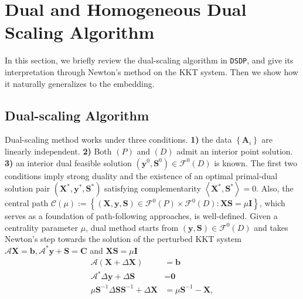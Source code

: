 \section{Dual and Homogeneous Dual Scaling Algorithm }\label{sec3}

In this section, we briefly review the dual-scaling algorithm in
{{\texttt{DSDP}}}, and give its interpretation through Newton's method on the KKT system. Then we show how it naturally generalizes to the embedding.
\subsection{Dual-scaling Algorithm}
Dual-scaling method
{\cite{benson1999mixed}} works under three conditions. {\textbf{1)}} the
 data $\left\{ \mathbf{A}_i \right\}$ are linearly independent.
{\textbf{2)}} Both $(P)$ and $(D)$ admit an interior point
solution. {\textbf{3)}} an interior dual feasible solution $\left( \mathbf{y}^0,
\mathbf{S}^0 \right) \in \mathcal{F}^0 (D)$ is known. The first two conditions imply
strong duality and the existence of an optimal primal-dual solution pair $\left(
\mathbf{X}^{\ast}, \mathbf{y}^{\ast}, \mathbf{S}^{\ast} \right)$ satisfying complementarity
$\left\langle \mathbf{X}^{\ast}, \mathbf{S}^{\ast} \right\rangle = 0$. Also, the central path $\mathcal{C} (\mu) :=
\left\{ \left( \mathbf{X}, \mathbf{y}, \mathbf{S} \right) \in \mathcal{F}^0 (P) \times \mathcal{F}^0
(D) : \mathbf{X} \mathbf{S} = \mu \mathbf{I} \right\}$, which serves as a foundation of
path-following approaches, is well-defined. Given a centrality parameter $\mu$, 
dual method starts from
$\left( \mathbf{y}, \mathbf{S} \right) \in \mathcal{F}^0(D)$ and takes Newton's step towards the solution of the perturbed KKT system $\mathcal{A} \mathbf{X} = \mathbf{b},
\mathcal{A}^{\ast} \mathbf{y} + \mathbf{S} = \mathbf{C}$ and $\mathbf{X} \mathbf{S} = \mu \mathbf{I}$
\begin{align}\label{dsdpnewton}
  \mathcal{A} \left( \mathbf{X} + \Delta \mathbf{X} \right) & = \mathbf{b} \nonumber \\
  \mathcal{A}^{\ast} \Delta \mathbf{y} + \Delta \mathbf{S} & = \textbf{0} \\
  \mu \mathbf{S}^{- 1} \Delta \mathbf{S} \mathbf{S}^{- 1} + \Delta \mathbf{X} & = \mu \mathbf{S}^{- 1} - \mathbf{X} \nonumber, 
\end{align}

